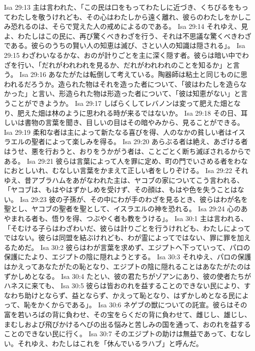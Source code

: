 Isa 29:13  主は言われた、「この民は口をもってわたしに近づき、くちびるをもってわたしを敬うけれども、その心はわたしから遠く離れ、彼らのわたしをかしこみ恐れるのは、そらで覚えた人の戒めによるのである。
Isa 29:14  それゆえ、見よ、わたしはこの民に、再び驚くべきわざを行う、それは不思議な驚くべきわざである。彼らのうちの賢い人の知恵は滅び、さとい人の知識は隠される」。
Isa 29:15  わざわいなるかな、おのが計りごとを主に深く隠す者。彼らは暗い中でわざを行い、「だれがわれわれを見るか、だれがわれわれのことを知るか」と言う。
Isa 29:16  あなたがたは転倒して考えている。陶器師は粘土と同じものに思われるだろうか。造られた物はそれを造った者について、「彼はわたしを造らなかった」と言い、形造られた物は形造った者について、「彼は知恵がない」と言うことができようか。
Isa 29:17  しばらくしてレバノンは変って肥えた畑となり、肥えた畑は林のように思われる時が来るではないか。
Isa 29:18  その日、耳しいは書物の言葉を聞き、目しいの目はその暗やみから、見ることができる。
Isa 29:19  柔和な者は主によって新たなる喜びを得、人のなかの貧しい者はイスラエルの聖者によって楽しみを得る。
Isa 29:20  あらぶる者は絶え、あざける者はうせ、悪を行おうと、おりをうかがう者は、ことごとく断ち滅ぼされるからである。
Isa 29:21  彼らは言葉によって人を罪に定め、町の門でいさめる者をわなにおとしいれ、むなしい言葉をかまえて正しい者をしりぞける。
Isa 29:22  それゆえ、昔アブラハムをあがなわれた主は、ヤコブの家についてこう言われる、「ヤコブは、もはやはずかしめを受けず、その顔は、もはや色を失うことはない。
Isa 29:23  彼の子孫が、その中にわが手のわざを見るとき、彼らはわが名を聖とし、ヤコブの聖者を聖として、イスラエルの神を恐れる。
Isa 29:24  心のあやまれる者も、悟りを得、つぶやく者も教をうける」。
Isa 30:1  主は言われる、「そむける子らはわざわいだ、彼らは計りごとを行うけれども、わたしによってではない。彼らは同盟を結ぶけれども、わが霊によってではない、罪に罪を加えるためだ。
Isa 30:2  彼らはわが言葉を求めず、エジプトへ下っていって、パロの保護にたより、エジプトの陰に隠れようとする。
Isa 30:3  それゆえ、パロの保護はかえってあなたがたの恥となり、エジプトの陰に隠れることはあなたがたのはずかしめとなる。
Isa 30:4  たとい、彼の君たちがゾアンにあり、彼の使者たちがハネスに来ても、
Isa 30:5  彼らは皆おのれを益することのできない民により、すなわち助けとならず、益とならず、かえって恥となり、はずかしめとなる民によって、恥をかくからである」。
Isa 30:6  ネゲブの獣についての託宣。彼らはその富を若いろばの背に負わせ、その宝をらくだの背に負わせて、雌じし、雄じし、まむしおよび飛びかけるへびの出る悩みと苦しみの国を通って、おのれを益することのできない民に行く。
Isa 30:7  そのエジプトの助けは無益であって、むなしい。それゆえ、わたしはこれを「休んでいるラハブ」と呼んだ。
